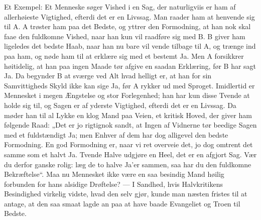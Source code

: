 \documentclass[12pt,a4paper]{book}
\begin{document}
Et Exempel: Et Menneske søger Vished i en Sag, der naturligviis er ham af
allerhøieste Vigtighed, efterdi det er en Livssag. Man raader ham at henvende sig til
A. A trøster ham paa det Bedste, og yttrer den Formodning, at han nok skal faae den
fuldkomne Vished, naar han kun vil raadføre sig med B. B giver ham ligeledes det
bedste Haab, naar han nu bare vil vende tilbage til A, og trænge ind paa ham, og nøde
ham til at erklære sig med et bestemt Ja. Men A forsikkrer høitidelig, at han paa
ingen Maade tør afgive en saadan Erklæring, før B har sagt Ja. Da begynder B at
sværge ved Alt hvad helligt er, at han for sin Samvittigheds Skyld ikke kan sige Ja,
før A rykker ud med Sproget. Imidlertid er Mennesket i megen Ængstelse og stor
Forlegenhed; han har kun disse Tvende at holde sig til, og Sagen er af yderste
Vigtighed, efterdi det er en Livssag. Da møder han til al Lykke en klog Mand paa
Veien, et kritisk Hoved, der giver ham følgende Raad: „Det er jo rigtignok sandt, at
Ingen af Vidnerne tør beedige Sagen med et fuldstændigt Ja; men Enhver af dem har dog
alligevel den bedste Formodning. En god Formodning er, naar vi ret overveie det, jo
dog omtrent det samme som et halvt Ja. Tvende Halve udgjøre en Heel, det er en
afgjort Sag. Vær du derfor ganske rolig: læg de to halve Ja'er sammen, saa har du den
fuldkomne Bekræftelse“. Maa nu Mennesket ikke være en saa besindig Mand høilig
forbunden for hans alsidige Drøftelse? --- I Sandhed, hvis Halvkritikens Besindighed
virkelig vidste, hvad den selv gjør, kunde man næsten fristes til at antage, at den
saa smaat lagde an paa at have baade Evangeliet og Troen til Bedste.
\end{document}
